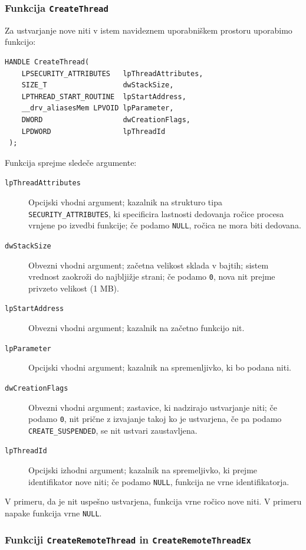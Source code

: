 \documentclass[a4paper,12pt,openright]{book}
\begin{document}
\subsubsection{Funkcija \texttt{CreateThread}}

Za ustvarjanje nove niti v istem navideznem uporabniškem prostoru uporabimo funkcijo:
\begin{lstlisting}[style=func]
 HANDLE CreateThread(
	LPSECURITY_ATTRIBUTES   lpThreadAttributes,
	SIZE_T                  dwStackSize,
	LPTHREAD_START_ROUTINE  lpStartAddress,
	__drv_aliasesMem LPVOID lpParameter,
	DWORD                   dwCreationFlags,
	LPDWORD                 lpThreadId
 );
\end{lstlisting}

Funkcija sprejme sledeče argumente:
\begin{description}
	\item[\texttt{lpThreadAttributes}] Opcijski vhodni argument; kazalnik na strukturo tipa \texttt{SECURITY\_ATTRIBUTES}, ki specificira lastnosti dedovanja ročice procesa vrnjene po izvedbi funkcije; če podamo \texttt{NULL}, ročica ne mora biti dedovana.
	\item[\texttt{dwStackSize}] Obvezni vhodni argument; začetna velikost sklada v bajtih; sistem vrednost zaokroži do najbljižje strani; če podamo \texttt{0}, nova nit prejme privzeto velikost (1 MB).
	\item[\texttt{lpStartAddress}] Obvezni vhodni argument; kazalnik na začetno funkcijo nit.
	\item[\texttt{lpParameter}] Opcijski vhodni argument; kazalnik na spremenljivko, ki bo podana niti.
	\item[\texttt{dwCreationFlags}] Obvezni vhodni argument; zastavice, ki nadzirajo ustvarjanje niti; če podamo \texttt{0}, nit prične z izvajanje takoj ko je ustvarjena, če pa podamo \texttt{CREATE\_SUSPENDED}, se nit ustvari zaustavljena.
	\item[\texttt{lpThreadId}] Opcijski izhodni argument; kazalnik na spremeljivko, ki prejme identifikator nove niti; če podamo \texttt{NULL}, funkcija ne vrne identifikatorja.
\end{description}

V primeru, da je nit uspešno ustvarjena, funkcija vrne ročico nove niti.
V primeru napake funkcija vrne \texttt{NULL}.

\subsubsection{Funkciji \texttt{CreateRemoteThread} in \texttt{CreateRemoteThreadEx}}
\end{document}
